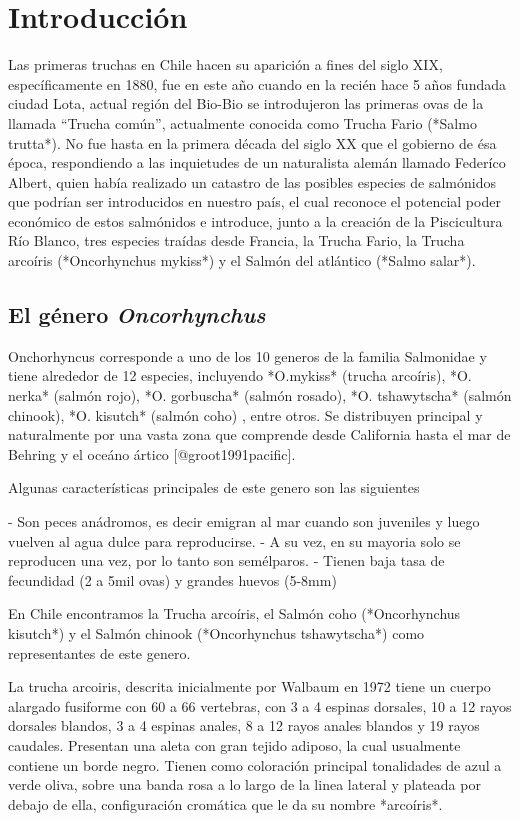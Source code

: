 \chapter{Introducción}
\label{cap.introduccion}

Las primeras truchas en Chile hacen su aparición a fines del siglo XIX, específicamente en 1880, fue en este año cuando en la recién hace 5 años fundada ciudad Lota, actual región del Bio-Bio se introdujeron las primeras ovas de la llamada “Trucha común”, actualmente conocida como Trucha Fario (*Salmo trutta*). No fue hasta en la primera década del siglo XX que el gobierno de ésa época, respondiendo a las inquietudes de un naturalista alemán llamado Federíco Albert, quien había realizado un catastro de las posibles especies de salmónidos que podrían ser introducidos en nuestro país, el cual reconoce el potencial poder económico de estos salmónidos e introduce, junto a la creación de la Piscicultura Río Blanco, tres especies traídas desde Francia, la Trucha Fario, la Trucha arcoíris (*Oncorhynchus mykiss*) y el Salmón del atlántico (*Salmo salar*).
\section{El género \emph{Oncorhynchus}}
Onchorhyncus corresponde a uno de los 10 generos de la familia Salmonidae y tiene alrededor de 12 especies, incluyendo *O.mykiss* (trucha arcoíris), *O. nerka* (salmón rojo), *O. gorbuscha* (salmón rosado), *O. tshawytscha* (salmón chinook), *O. kisutch* (salmón coho) , entre otros. Se distribuyen principal y naturalmente por una vasta zona que comprende desde California hasta el mar de Behring y el oceáno ártico [@groot1991pacific].

Algunas características principales de este genero son las siguientes

- Son peces anádromos, es decir emigran al mar cuando son juveniles y luego vuelven al agua dulce para reproducirse.
- A su vez, en su mayoria solo se reproducen una vez, por lo tanto son semélparos.
- Tienen baja tasa de fecundidad (2 a 5mil ovas) y grandes huevos (5-8mm)

En Chile encontramos la Trucha arcoíris, el Salmón coho (*Oncorhynchus kisutch*) y el Salmón chinook (*Oncorhynchus tshawytscha*) como representantes de este genero.

La trucha arcoiris, descrita inicialmente por Walbaum en 1972 tiene un cuerpo alargado fusiforme con 60 a 66 vertebras, con 3 a 4 espinas dorsales, 10 a 12 rayos dorsales blandos, 3 a 4 espinas anales, 8 a 12 rayos anales blandos y 19 rayos caudales. Presentan una aleta con gran tejido adiposo, la cual usualmente contiene un borde negro. Tienen como coloración principal tonalidades de azul a verde oliva, sobre una banda rosa a lo largo de la linea lateral y plateada por debajo de ella, configuración cromática que le da su nombre *arcoíris*.

